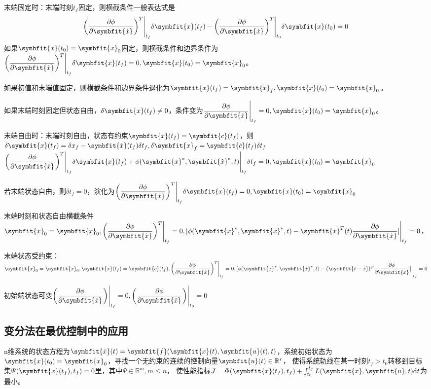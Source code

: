 \documentclass[11pt,a4paper]{ctexart}
\renewcommand{\d}{{\rm d}}
\newcommand{\bm}{\symbfit}
\begin{document}
        末端固定时：末端时刻$t_f$固定，则横截条件一般表达式是
        \[
        \bigg(\dfrac{\partial\phi}{\partial\bm{\dot x}}\bigg)^T\Bigg|_{t_f}\delta\bm{x}(t_f)-\bigg(\dfrac{\partial\phi}{\partial\bm{\dot x}}\bigg)^T\Bigg|_{t_0}\delta\bm{x}(t_0)=0
        \]
        如果$\bm{x}(t_0)=\bm{x}_0$固定，则横截条件和边界条件为$\bigg(\dfrac{\partial\phi}{\partial\bm{\dot x}}\bigg)^T\Bigg|_{t_f}\delta\bm{x}(t_f)=0,\bm{x}(t_0)=\bm{x}_0$。

        如果初值和末端值固定，则横截条件和边界条件退化为$\bm{x}(t_f)=\bm{x}_f,\bm{x}(t_0)=\bm{x}_0$。

        如果末端时刻固定但状态自由，$\delta\bm{x}(t_f)\neq0$，条件变为$\dfrac{\partial\phi}{\partial\bm{\dot x}}\Bigg|_{t_f}=0,\bm{x}(t_0)=\bm{x}_0$。

        末端自由时：末端时刻自由，状态有约束$\bm{x}(t_f)=\bm{c}(t_f)$，则$\delta\bm{x}(t_f)=\delta{x}_f-\bm{\dot x}(t_f)\delta t_f,\delta\bm{x}_f=\bm{\dot c}(t_f)\delta t_f$
        $\bigg(\dfrac{\partial\phi}{\partial\bm{\dot x}}\bigg)^T\Bigg|_{t_f}\delta\bm{x}(t_f)+\phi(\bm{x}^*,\bm{\dot x}^*,t)\Bigg|_{t_f}\delta t_f=0,\bm{x}(t_0)=\bm{x}_0$
        
        若末端状态自由，则$\delta t_f=0$，演化为$\bigg(\dfrac{\partial\phi}{\partial\bm{\dot x}}\bigg)^T\Bigg|_{t_f}\delta\bm{x}(t_f)=0,\bm{x}(t_0)=\bm{x}_0$
        
        末端时刻和状态自由横截条件$\bm{x}_0=\bm{x}_0,\bigg(\dfrac{\partial\phi}{\partial\bm{\dot x}}\bigg)^T\Bigg|_{t_f}=0,[\phi(\bm{x}^*,\bm{\dot x}^*,t)-\bm{\dot x}^T(t)\dfrac{\partial\phi}{\partial\bm{\dot x}}]\Bigg|_{t_f}=0$，
        
        末端状态受约束：$\bm{x}_0=\bm{x}_0,\bm{x}(t_f)=\bm{c}(t_f),\bigg(\dfrac{\partial\phi}{\partial\bm{\dot x}}\bigg)^T\Bigg|_{t_f}
        =0,[\phi(\bm{x}^*,\bm{\dot x}^*,t)-(\bm{\dot c-\dot x})^T\dfrac{\partial\phi}{\partial\bm{\dot x}}]\Bigg|_{t_f}=0$
        
        初始端状态可变$\bigg(\dfrac{\partial\phi}{\partial\bm{\dot x}}\bigg)\Bigg|_{t_f}=0,\bigg(\dfrac{\partial\phi}{\partial\bm{\dot x}}\bigg)\Bigg|_{t_0}=0$
    \subsection{变分法在最优控制中的应用}
        n维系统的状态方程为$\bm{\dot x}(t)=\bm{f}(\bm{x}(t),\bm{u}(t),t)$，系统初始状态为$\bm{x}(t_0)=\bm{x}_0$，寻找一个无约束的连续的控制向量$\bm{u}(t)\in\mathbb{R}^r$，
        使得系统轨线在某一时刻$t_f>t_0$转移到目标集$\varPsi(\bm{x}(t_f),t_f)=0$里，其中$\varPsi\in\mathbb{R}^m,m\leqslant n$，
        使性能指标$J=\Phi(\bm{x}(t_f),t_f)+\int_{t_0}^{t_f}L(\bm{x},\bm{u},t)\d t$为最小。
\end{document}
